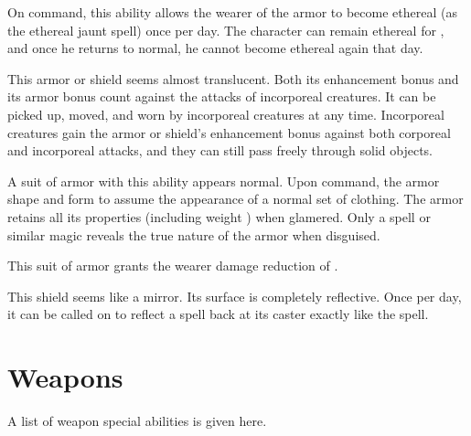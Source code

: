 
 On command, this ability allows the wearer of the armor to become ethereal (as the ethereal jaunt spell) once per day. The character can remain ethereal for , and once he returns to normal, he cannot become ethereal again that day.


 This armor or shield seems almost translucent. Both its enhancement bonus and its armor bonus count against the attacks of incorporeal creatures. It can be picked up, moved, and worn by incorporeal creatures at any time. Incorporeal creatures gain the armor or shield's enhancement bonus against both corporeal and incorporeal attacks, and they can still pass freely through solid objects.


 A suit of armor with this ability appears normal. Upon command, the armor  shape and form to assume the appearance of a normal set of clothing. The armor retains all its properties (including weight ) when glamered. Only a  spell or similar magic reveals the true nature of the armor when disguised.


 This suit of armor grants the wearer damage reduction of .


 This shield seems like a mirror. Its surface is completely reflective. Once per day, it can be called on to reflect a spell back at its caster exactly like the  spell.


\section{Weapons}

A list of weapon special abilities is given here.

